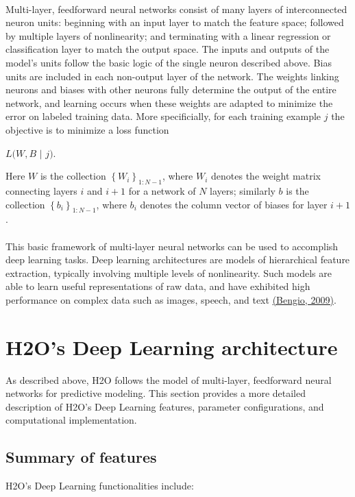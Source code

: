 \documentclass[11pt]{article}
\begin{document}
\\
\noindent
Multi-layer, feedforward neural networks consist of many layers of interconnected neuron units: beginning with an input layer to match the feature space; followed by multiple layers of nonlinearity; and terminating with a linear regression or classification layer to match the output space. The inputs and outputs of the model's units follow the basic logic of the single neuron described above. Bias units are included in each non-output layer of the network. The weights linking neurons and biases with other neurons fully determine the output of the entire network, and learning occurs when these weights are adapted to minimize the error on labeled training data. More specificially, for each training example $j$ the objective is to minimize a loss function 
\begin{center}
$L(W,B$ $|$ $j)$.
\end{center}
Here $W$ is the collection $\left\{W_i\right\}_{1:N-1}$, where $W_i$ denotes the weight matrix connecting layers $i$ and $i+1$ for a network of $N$ layers; similarly $b$ is the collection $\left\{b_i\right\}_{1:N-1}$, where $b_i$ denotes the column vector of biases for layer $i+1$. 
\\
\\
This basic framework of multi-layer neural networks can be used to accomplish deep learning tasks. Deep learning architectures are models of hierarchical feature extraction, typically involving multiple levels of nonlinearity. Such models are able to learn useful representations of raw data, and have exhibited high performance on complex data such as images, speech, and text \href{http://www.iro.umontreal.ca/~lisa/pointeurs/TR1312.pdf}{(Bengio, 2009)}. 


\section{H2O's Deep Learning architecture} \label{2}

As described above, H2O follows the model of multi-layer, feedforward neural networks for predictive modeling. This section provides a more detailed description of H2O's Deep Learning features, parameter configurations, and computational implementation.

\subsection{Summary of features} \label{2.1}
H2O's Deep Learning functionalities include:
\end{document}
